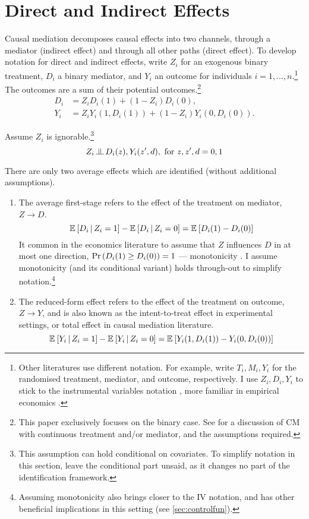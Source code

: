 \section{Direct and Indirect Effects}
\label{sec:mediation}
Causal mediation decomposes causal effects into two channels, through a mediator (indirect effect) and through all other paths (direct effect).
To develop notation for direct and indirect effects, write $Z_i$ for an exogenous binary treatment, $D_i$ a binary mediator, and $Y_i$ an outcome for individuals $i = 1, \hdots, n$.\footnote{
    Other literatures use different notation.
    For example, \cite{imai2010identification} write $T_i, M_i, Y_i$ for the randomised treatment, mediator, and outcome, respectively.
    I use $Z_i, D_i, Y_i$ to stick to the instrumental variables notation \cite{angrist1996identification}, more familiar in empirical economics \citep{angrist2009mostly}. 
}
The outcomes are a sum of their potential outcomes.\footnote{
    This paper exclusively focuses on the binary case.
    See \cite{huber2020direct} for a discussion of CM with continuous treatment and/or mediator, and the assumptions required.
}
\begin{align*}
    D_i &= Z_i       D_i(1)
        + (1 - Z_i) D_i(0),  \\
    Y_i &= Z_i       Y_i(1, D_i(1))
        + (1 - Z_i) Y_i(0, D_i(0)).
\end{align*}

Assume $Z_i$ is ignorable.\footnote{
    This assumption can hold conditional on covariates.
    To simplify notation in this section, leave the conditional part unsaid, as it changes no part of the identification framework.
}
\[ Z_i \indep  D_i(z), Y_i(z', d), \textnormal{ for } z, z', d = 0, 1 \]

There are only two average effects which are identified (without additional assumptions).
\begin{enumerate}
    \item The average first-stage refers to the effect of the treatment on mediator, $Z \to D$.
    \[ \mathbb{E}_{} \left[ D_i \, \middle\vert \, Z_i = 1 \right] - \mathbb{E}_{} \left[ D_i \, \middle\vert \, Z_i = 0 \right]
        = \mathbb{E}_{} \left[ D_i(1) - D_i(0) \right] \]
    It common in the economics literature to assume that $Z$ influences $D$ in at most one direction, $\Pr\left( D_i(1) \geq D_i(0) \right) = 1$ --- monotonicity \citep{imbens1994identification}.
    I assume monotonicity (and its conditional variant) holds through-out to simplify notation.\footnote{
        Assuming monotonicity also brings closer to the IV notation, and has other beneficial implications in this setting (see \autoref{sec:controlfun}).
    }
    \item The reduced-form effect refers to the effect of the treatment on outcome, $Z \to Y$, and is also known as the intent-to-treat effect in experimental settings, or total effect in causal mediation literature.
    \[ \mathbb{E}_{} \left[ Y_i \, \middle\vert \, Z_i = 1 \right] - \mathbb{E}_{} \left[ Y_i \, \middle\vert \, Z_i = 0 \right]
        = \mathbb{E}_{} \left[ Y_i(1, D_i(1)) - Y_i(0, D_i(0)) \right] \]
\end{enumerate}

